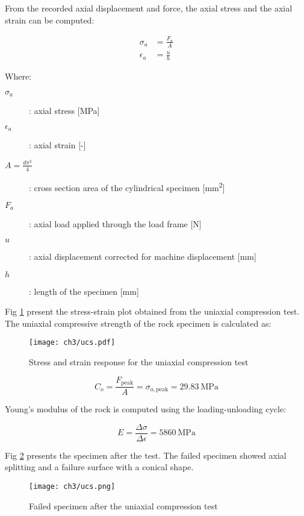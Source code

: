 From the recorded axial displacement and force, the axial stress and the axial strain can be computed: 

\begin{align}
    \sigma_a &= \frac{F_a}{A} \\
    \epsilon_a &= \frac{u}{h}
\end{align}

Where:

\begin{description}
    \item[$\sigma_a$] : axial stress  [\si{\mega\pascal}]
    \item[$\epsilon_a$] : axial strain [-]
    \item[$A=\frac{d\pi^2}{4}$] : cross section area of the cylindrical specimen [\si{\milli\meter\squared}]
    \item[$F_a$] :  axial load applied through the load frame [\si{\newton}]
    \item[$u$] : axial displacement corrected for machine displacement [\si{\milli\meter}]
    \item[$h$] : length of the specimen [\si{\milli\meter}]
\end{description}

Fig \ref{fig3:2} present the stress-strain plot obtained from the uniaxial compression test. The uniaxial compressive strength of the rock specimen is calculated as: 


\begin{figure}[p]
    \centering
    \texttt{[image: ch3/ucs.pdf]}
    \caption{Stress and strain response for the uniaxial compression test}
    \label{fig3:2}
\end{figure} 

\begin{equation}
    C_o = \frac{F_\text{peak}}{A} = \sigma_{a,\text{peak}} = \SI{29.83}{\mega\pascal}
\end{equation}

Young’s modulus of the rock is computed using the loading-unloading cycle:

\begin{equation}
    E=\frac{\Delta\sigma}{\Delta\epsilon} = \SI{5860}{\mega\pascal}
\end{equation}

Fig \ref{fig3:3} presents the specimen after the test. The failed specimen showed axial splitting and a failure surface with a conical shape. 

\begin{figure}[p]
    \centering
    \texttt{[image: ch3/ucs.png]}
    \caption{Failed specimen after the uniaxial compression test}
    \label{fig3:3}
\end{figure} 

